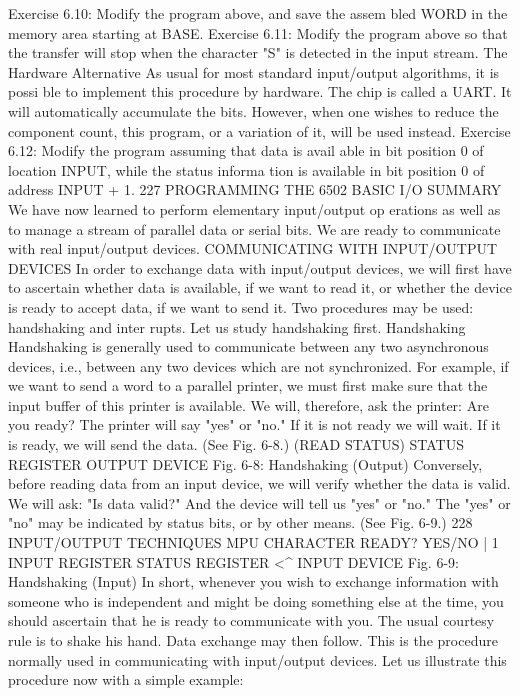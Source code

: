 Exercise 6.10: Modify the program above, and save the assem
bled WORD in the memory area starting at BASE.
Exercise 6.11: Modify the program above so that the transfer
will stop when the character "S" is detected in the input stream.
The Hardware Alternative
As usual for most standard input/output algorithms, it is possi
ble to implement this procedure by hardware. The chip is called a
UART. It will automatically accumulate the bits. However, when
one wishes to reduce the component count, this program, or a
variation of it, will be used instead.
Exercise 6.12: Modify the program assuming that data is avail
able in bit position 0 of location INPUT, while the status informa
tion is available in bit position 0 of address INPUT + 1.
227
PROGRAMMING THE 6502
BASIC I/O SUMMARY
We have now learned to perform elementary input/output op
erations as well as to manage a stream of parallel data or serial
bits. We are ready to communicate with real input/output devices.
COMMUNICATING WITH INPUT/OUTPUT DEVICES
In order to exchange data with input/output devices, we will
first have to ascertain whether data is available, if we want to
read it, or whether the device is ready to accept data, if we want to
send it. Two procedures may be used: handshaking and inter
rupts. Let us study handshaking first.
Handshaking
Handshaking is generally used to communicate between any
two asynchronous devices, i.e., between any two devices which
are not synchronized. For example, if we want to send a word to a
parallel printer, we must first make sure that the input buffer of
this printer is available. We will, therefore, ask the printer: Are
you ready? The printer will say "yes" or "no." If it is not ready we
will wait. If it is ready, we will send the data. (See Fig. 6-8.)
(READ
STATUS)
STATUS
REGISTER
OUTPUT
DEVICE
Fig. 6-8: Handshaking (Output)
Conversely, before reading data from an input device, we will
verify whether the data is valid. We will ask: "Is data valid?" And
the device will tell us "yes" or "no." The "yes" or "no" may be
indicated by status bits, or by other means. (See Fig. 6-9.)
228
INPUT/OUTPUT TECHNIQUES
MPU
CHARACTER
READY?
YES/NO
| 1
INPUT
REGISTER
STATUS
REGISTER
<^
INPUT
DEVICE
Fig. 6-9: Handshaking (Input)
In short, whenever you wish to exchange information with
someone who is independent and might be doing something else
at the time, you should ascertain that he is ready to communicate
with you. The usual courtesy rule is to shake his hand. Data
exchange may then follow. This is the procedure normally used in
communicating with input/output devices.
Let us illustrate this procedure now with a simple example:
